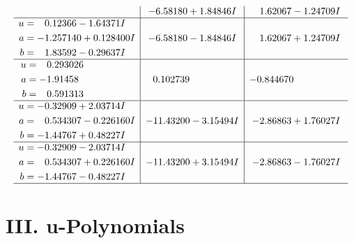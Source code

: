 \documentclass[1p]{elsarticle_modified}
\theoremstyle{definition}
\begin{document}
$$\begin{array}{c|c|c}
 & -6.58180 + 1.84846 I & \phantom{-}1.62067 - 1.24709 I \\ \hline\begin{aligned}
u &= \phantom{-}0.12366 - 1.64371 I \\
a &= -1.257140 + 0.128400 I \\
b &= \phantom{-}1.83592 - 0.29637 I\end{aligned}
 & -6.58180 - 1.84846 I & \phantom{-}1.62067 + 1.24709 I \\ \hline\begin{aligned}
u &= \phantom{-}0.293026\phantom{ +0.000000I} \\
a &= -1.91458\phantom{ +0.000000I} \\
b &= \phantom{-}0.591313\phantom{ +0.000000I}\end{aligned}
 & \phantom{-}0.102739\phantom{ +0.000000I} & -0.844670\phantom{ +0.000000I} \\ \hline\begin{aligned}
u &= -0.32909 + 2.03714 I \\
a &= \phantom{-}0.534307 - 0.226160 I \\
b &= -1.44767 + 0.48227 I\end{aligned}
 & -11.43200 - 3.15494 I & -2.86863 + 1.76027 I \\ \hline\begin{aligned}
u &= -0.32909 - 2.03714 I \\
a &= \phantom{-}0.534307 + 0.226160 I \\
b &= -1.44767 - 0.48227 I\end{aligned}
 & -11.43200 + 3.15494 I & -2.86863 - 1.76027 I\\
 \hline 
 \end{array}$$\newpage
\newpage\renewcommand{\arraystretch}{1}
\centering \section*{ III. u-Polynomials}
\end{document}
